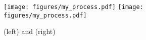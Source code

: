 \begin{figure}[ht]
\centering
\texttt{[image: figures/my\_process.pdf]}
\texttt{[image: figures/my\_process.pdf]}
\caption{(left) and (right)
 \label{fig:resolution}}
\end{figure}
